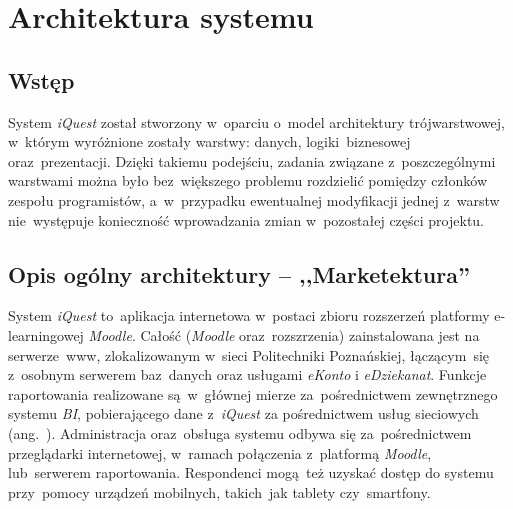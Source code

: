 \chapter{Architektura systemu}
\label{Chapter5}

\section{Wstęp}
\label{Chapter51}

System \textit{iQuest} został stworzony w~oparciu o~model architektury trójwarstwowej, w~którym wyróżnione zostały warstwy: danych, logiki~biznesowej oraz~prezentacji. Dzięki takiemu podejściu, zadania związane z~poszczególnymi warstwami można było bez~większego problemu rozdzielić pomiędzy członków zespołu programistów, a~w~przypadku ewentualnej modyfikacji jednej z~warstw nie~występuje konieczność wprowadzania zmian w~pozostałej części projektu.

\section{Opis ogólny architektury -- ,,Marketektura''}
\label{Chapter52}

System \textit{iQuest} to~aplikacja internetowa w~postaci zbioru rozszerzeń platformy e-learningowej \textit{Moodle}. Całość (\textit{Moodle} oraz~rozszrzenia) zainstalowana jest na serwerze~www, zlokalizowanym w~sieci Politechniki Poznańskiej, łączącym~się z~osobnym serwerem baz~danych oraz usługami \textit{eKonto} i \textit{eDziekanat}. Funkcje raportowania realizowane są~w~głównej mierze za~pośrednictwem zewnętrznego systemu \textit{BI}, pobierającego dane z~\textit{iQuest} za pośrednictwem usług sieciowych (ang.~). Administracja oraz~obsługa systemu odbywa się za~pośrednictwem przeglądarki internetowej, w~ramach połączenia z~platformą \textit{Moodle}, lub~serwerem raportowania. Respondenci mogą~też uzyskać dostęp do systemu przy~pomocy urządzeń mobilnych, takich~jak tablety czy~smartfony.

